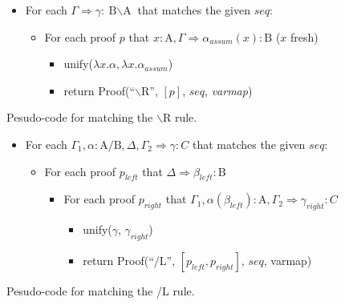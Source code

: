 \documentclass[11pt]{article}
\begin{document}
\begin{figure}
\noindent
\begin{boxedminipage}{\textwidth}
\begin{itemize}
  \item For each $\Gamma \Rightarrow \gamma:\textrm{B$\backslash$A}$ that matches the given $seq$:
  \begin{itemize}
    \item For each proof $p$ that 
          $x:\textrm{A},\Gamma \Rightarrow \alpha_{assum}(x):\textrm{B}$ ($x$ fresh)
    \begin{itemize}
      \item unify($\lambda x.\alpha, \lambda x.\alpha_{assum}$)
      \item return Proof(``$\backslash$R'', $[p]$, $seq$, \textit{varmap})
    \end{itemize}
  \end{itemize}
\end{itemize}
\vspace{2mm}
\end{boxedminipage}
\caption{Pesudo-code for matching the $\backslash$R rule.}
\label{fig:lslash_r}
\end{figure}

\begin{figure}
\noindent
\begin{boxedminipage}{\textwidth}
\begin{itemize}
  \item For each $\Gamma_1, \alpha:\textrm{A/B}, \Delta, \Gamma_2 \Rightarrow \gamma:C$ that matches the
  given $seq$:
  \begin{itemize}
    \item For each proof $p_{left}$ that $\Delta \Rightarrow \beta_{left}:$B
    \begin{itemize}
      \item For each proof $p_{right}$ that 
            $\Gamma_1, \alpha(\beta_{left}):\textrm{A}, \Gamma_2 \Rightarrow \gamma_{right}:C$
      \begin{itemize}
        \item unify($\gamma$, $\gamma_{right}$)
        \item return Proof(``/L'', $\left[p_{left}, p_{right}\right]$, 
              $seq$, varmap)
      \end{itemize}
    \end{itemize}
  \end{itemize}
\end{itemize}
\vspace{2mm}
\end{boxedminipage}
\caption{Pesudo-code for matching the /L rule.}
\label{fig:rslash_l}
\end{figure}
\end{document}
